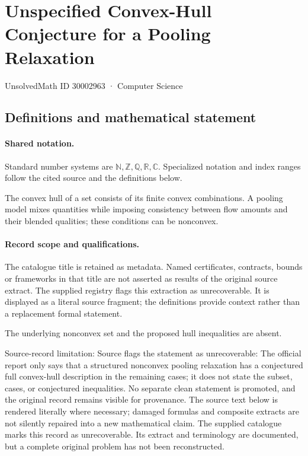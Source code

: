 \documentclass[11pt]{article}
\begin{document}
\setcounter{section}{30002962}
\section{Unspecified Convex-Hull Conjecture for a Pooling Relaxation}\label{30002963}
{\small\sffamily UnsolvedMath ID 30002963 · Computer Science}
\subsection{Definitions and mathematical statement}

\paragraph{Shared notation.}Standard number systems are $\mathbb N,\mathbb Z,\mathbb Q,\mathbb R,\mathbb C$. Specialized notation and index ranges follow the cited source and the definitions below.


The convex hull of a set consists of its finite convex combinations. A pooling model mixes quantities while imposing consistency between flow amounts and their blended qualities; these conditions can be nonconvex.
\paragraph{Record scope and qualifications.}
The catalogue title is retained as metadata. Named certificates, contracts, bounds or frameworks in that title are not asserted as results of the original source extract.
The supplied registry flags this extraction as unrecoverable. It is displayed as a literal source fragment; the definitions provide context rather than a replacement formal statement.

The underlying nonconvex set and the proposed hull inequalities are absent.

Source-record limitation: Source flags the statement as unrecoverable: The official report only says that a structured nonconvex pooling relaxation has a conjectured full convex-hull description in the remaining cases; it does not state the subset, cases, or conjectured inequalities. No separate clean statement is promoted, and the original record remains visible for provenance.
The source text below is rendered literally where necessary; damaged formulas and composite extracts are not silently repaired into a new mathematical claim.
The supplied catalogue marks this record as unrecoverable. Its extract and terminology are documented, but a complete original problem has not been reconstructed.
\end{document}
